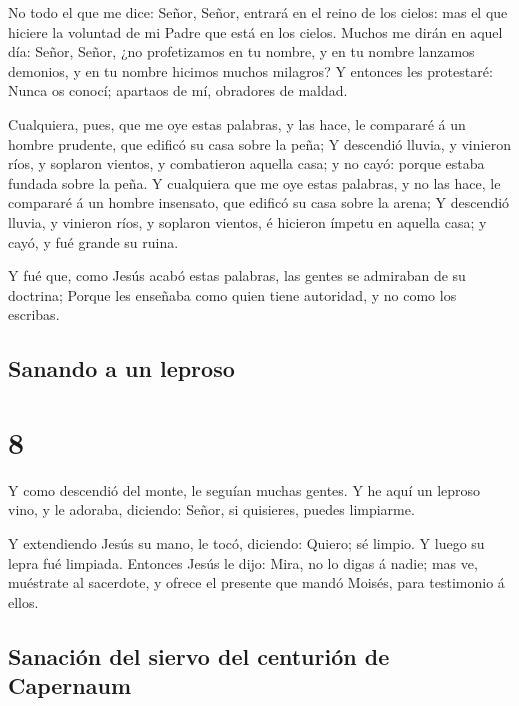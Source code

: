  No todo el que me dice: Señor, Señor, entrará en el
reino de los cielos: mas el que hiciere la voluntad de mi Padre que está
en los cielos.  Muchos me dirán en aquel día: Señor,
Señor, ¿no profetizamos en tu nombre, y en tu nombre lanzamos demonios,
y en tu nombre hicimos muchos milagros?  Y entonces les
protestaré: Nunca os conocí; apartaos de mí, obradores de maldad.

 Cualquiera, pues, que me oye estas palabras, y las hace,
le compararé á un hombre prudente, que edificó su casa sobre la peña;
 Y descendió lluvia, y vinieron ríos, y soplaron vientos,
y combatieron aquella casa; y no cayó: porque estaba fundada sobre la
peña.  Y cualquiera que me oye estas palabras, y no las
hace, le compararé á un hombre insensato, que edificó su casa sobre la
arena;  Y descendió lluvia, y vinieron ríos, y soplaron
vientos, é hicieron ímpetu en aquella casa; y cayó, y fué grande su
ruina.

 Y fué que, como Jesús acabó estas palabras, las gentes
se admiraban de su doctrina;  Porque les enseñaba como
quien tiene autoridad, y no como los escribas.

\hypertarget{sanando-a-un-leproso}{%
\subsection{Sanando a un leproso}\label{sanando-a-un-leproso}}

\hypertarget{section-7}{%
\section{8}\label{section-7}}

 Y como descendió del monte, le seguían muchas gentes.
 Y he aquí un leproso vino, y le adoraba, diciendo: Señor,
si quisieres, puedes limpiarme.

 Y extendiendo Jesús su mano, le tocó, diciendo: Quiero;
sé limpio. Y luego su lepra fué limpiada.  Entonces Jesús
le dijo: Mira, no lo digas á nadie; mas ve, muéstrate al sacerdote, y
ofrece el presente que mandó Moisés, para testimonio á ellos.

\hypertarget{sanaciuxf3n-del-siervo-del-centuriuxf3n-de-capernaum}{%
\subsection{Sanación del siervo del centurión de
Capernaum}\label{sanaciuxf3n-del-siervo-del-centuriuxf3n-de-capernaum}}

